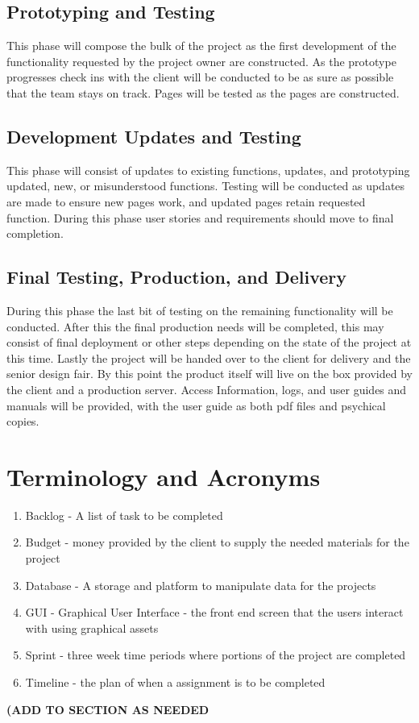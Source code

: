 \subsection{Prototyping and Testing}
This phase will compose the bulk of the project as the first development of the functionality requested by the project owner are constructed. As the prototype progresses check ins with the client will be conducted to be as sure as possible that the team stays on track. Pages will be tested as the pages are constructed.

\subsection{Development Updates and Testing}
This phase will consist of updates to existing functions, updates, and prototyping updated, new, or misunderstood functions. Testing will be conducted as updates are made to ensure new pages work, and updated pages retain requested function. During this phase user stories and requirements should move to final completion.

\subsection{Final Testing, Production, and Delivery}
During this phase the last bit of testing on the remaining functionality will be conducted. After this the final production needs will be completed, this may consist of final deployment or other steps depending on the state of the project at this time. Lastly the project will be handed over to the client for delivery and the senior design fair. By this point the product itself will live on the box provided by the client and a production server. Access Information, logs, and user guides and manuals will be provided, with the user guide as both pdf files and psychical copies.


\section{Terminology and Acronyms}
\begin{enumerate}
\item Backlog - A list of task to be completed
\item Budget - money provided by the client to supply the needed materials for the project
\item Database - A storage and platform to manipulate data for the projects 
\item GUI - Graphical User Interface - the front end screen that the users interact with using graphical assets
\item Sprint - three week time periods where portions of the project are completed
\item Timeline - the plan of when a assignment is to be completed
\end{enumerate}
\bf(ADD TO SECTION AS NEEDED 
